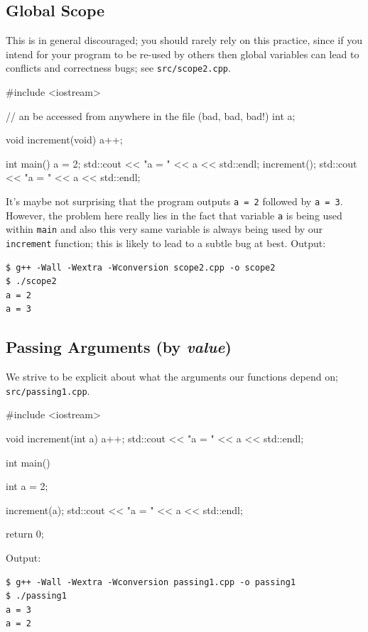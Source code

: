 \documentclass[12pt,letterpaper,twoside]{article}
\begin{document}
\subsection{Global Scope} This is in general discouraged; you should rarely rely on this 
practice, since if you intend for your program to be re-used by others then global variables can lead to conflicts and correctness bugs; see
\texttt{src/scope2.cpp}.

\begin{cpp}
#include <iostream>

// an be accessed from anywhere in the file (bad, bad, bad!)
int a;

void increment(void) { a++; }

int main() {
  a = 2;
  std::cout << "a = " << a << std::endl;
  increment();
  std::cout << "a = " << a << std::endl;
}
\end{cpp}

It's maybe not surprising that the program outputs \texttt{a = 2} followed by \texttt{a = 3}. However, the problem here really lies in the fact that variable \texttt{a} is being used within \texttt{main} and also this very same variable is always being used by our \texttt{increment} function; this is likely to lead to a subtle bug at best. Output:

\begin{verbatim}
$ g++ -Wall -Wextra -Wconversion scope2.cpp -o scope2
$ ./scope2
a = 2
a = 3
\end{verbatim}

\subsection{Passing Arguments (by \emph{value})}
 We strive to be explicit about what the arguments our
functions depend on; 
\texttt{src/passing1.cpp}.

\begin{cpp}
#include <iostream>

void increment(int a) {
  a++;
  std::cout << "a = " << a << std::endl;
}

int main() {
  int a = 2;

  increment(a);
  std::cout << "a = " << a << std::endl;

  return 0;
}
\end{cpp}

Output:

\begin{verbatim}
$ g++ -Wall -Wextra -Wconversion passing1.cpp -o passing1
$ ./passing1
a = 3
a = 2
\end{verbatim}
\end{document}
